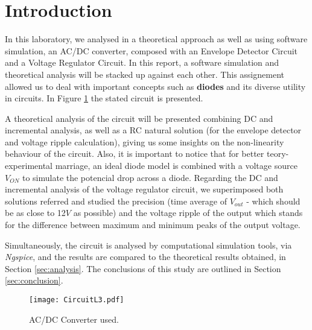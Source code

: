 \section{Introduction}
\label{sec:introduction}

In this laboratory, we analysed in a theoretical approach as well as using software simulation, an AC/DC converter, composed with an Envelope Detector Circuit and a Voltage Regulator Circuit. In this report, a software simulation and theoretical analysis will be stacked up against each other. This assignement allowed us to deal with important concepts such as \textbf{diodes} and its diverse utility in circuits. In Figure \ref{fig:circuitol3} the stated circuit is presented. 

A theoretical analysis of the circuit will be presented combining DC and incremental analysis, as well as a RC natural solution (for the envelope detector and voltage ripple calculation), giving us some insights on the non-linearity behaviour of the circuit. Also, it is important to notice that for better teory-experimental marriage, an ideal diode model is combined with a voltage source $V_{ON}$ to simulate the potencial drop across a diode.  
Regarding the DC and incremental analysis of the voltage regulator circuit, we superimposed both solutions referred and studied the precision (time average of $V_{out}$ - which should be as close to 12$V$ as possible) and the voltage ripple of the output which stands for the difference between maximum and minimum peaks of the output voltage.

Simultaneously, the circuit is analysed by computational simulation tools, via \textit{Ngspice}, and the results are compared to the theoretical results obtained, in Section \ref{sec:analysis}. The conclusions of this study are outlined in Section \ref{sec:conclusion}.

\begin{figure}[h] \centering
\texttt{[image: CircuitL3.pdf]}
\caption{AC/DC Converter used.}
\label{fig:circuitol3}
\end{figure}

\clearpage
